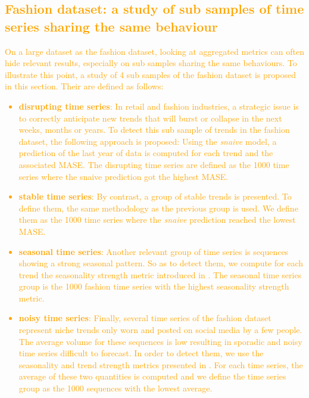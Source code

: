 \documentclass[10pt]{article} %
\begin{document}
\textcolor{orange}{
\section{Fashion dataset: a study of sub samples of time series sharing the same behaviour}
}
\textcolor{orange}{
On a large dataset as the fashion dataset, looking at aggregated metrics can often hide relevant results, especially on sub samples sharing the same behaviours. To illustrate this point, a study of 4 sub samples of the fashion dataset is proposed in this section. Their are defined as follows:
\begin{itemize}
\item \textbf{disrupting time series}: In retail and fashion industries, a strategic issue is to correctly anticipate new trends that will burst or collapse in the next weeks, months or years. To detect this sub sample of trends in the fashion dataset, the following approach is proposed: Using the \textit{snaive} model, a prediction of the last year of data is computed for each trend and the associated MASE. The disrupting time series are defined as the 1000 time series where the snaive prediction got the highest MASE.
\item \textbf{stable time series}: By contrast, a group of stable trends is presented. To define them, the same methodology as the previous group is used. We define them as the 1000 time series where the \textit{snaive} prediction reached the lowest MASE. 
\item \textbf{seasonal time series}: Another relevant group of time series is sequences showing a strong seasonal pattern. So as to detect them, we compute for each trend the seasonality strength metric introduced in \citet{wang2006}. The seasonal time series group is the 1000 fashion time series with the highest seasonality strength metric.
\item \textbf{noisy time series}: Finally, several time series of the fashion dataset represent niche trends only worn and posted on social media by a few people. The average volume for these sequences is low resulting in sporadic and noisy time series difficult to forecast. In order to detect them, we use the seasonality and trend strength metrics presented in \citet{wang2006}. For each time series, the average of these two quantities is computed and we define the time series group as the 1000 sequences with the lowest average.
\end{itemize}
}
\end{document}
